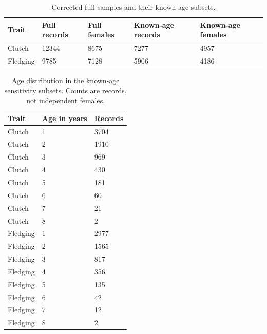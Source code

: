 \documentclass{article}
\begin{document}
\begin{table}[!ht]\centering\scriptsize\singlespacing
\caption{Corrected full samples and their known-age subsets.}\label{tab:age-sample}
\begin{tabular}{lllll}\toprule
Trait & Full records & Full females & Known-age records & Known-age females\\\midrule
Clutch & 12344 & 8675 & 7277 & 4957\\
Fledging & 9785 & 7128 & 5906 & 4186\\
\bottomrule\end{tabular}\end{table}
\begin{table}[!ht]\centering\scriptsize\singlespacing
\caption{Age distribution in the known-age sensitivity subsets. Counts are records, not independent females.}\label{tab:exact-age-counts}
\begin{tabular}{lll}\toprule
Trait & Age in years & Records\\\midrule
Clutch & 1 & 3704\\
Clutch & 2 & 1910\\
Clutch & 3 & 969\\
Clutch & 4 & 430\\
Clutch & 5 & 181\\
Clutch & 6 & 60\\
Clutch & 7 & 21\\
Clutch & 8 & 2\\
Fledging & 1 & 2977\\
Fledging & 2 & 1565\\
Fledging & 3 & 817\\
Fledging & 4 & 356\\
Fledging & 5 & 135\\
Fledging & 6 & 42\\
Fledging & 7 & 12\\
Fledging & 8 & 2\\
\bottomrule\end{tabular}\end{table}
\end{document}
